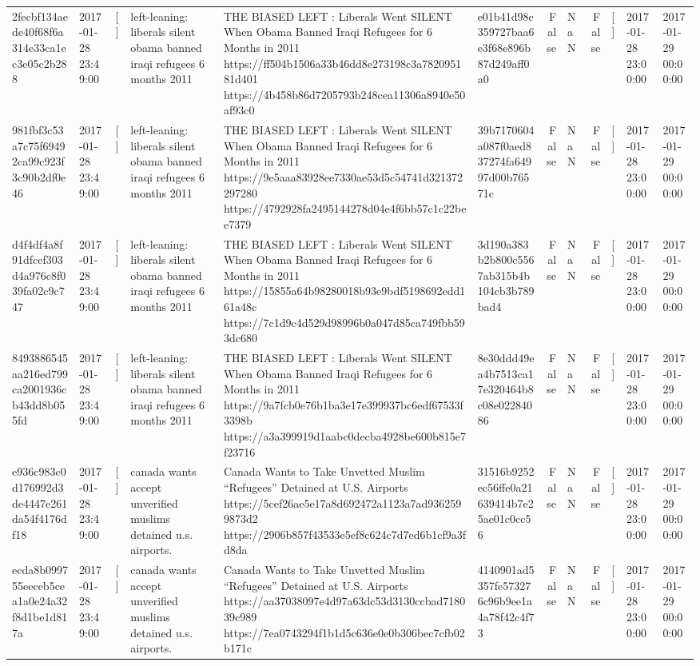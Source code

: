 \begin{tabular}{llllllrlrlll}
2fecbf134aede40f68f6a314e33ca1ec3e05c2b288 & 2017-01-28 23:49:00 & [] & left-leaning: liberals silent obama banned iraqi refugees 6 months 2011 & THE BIASED LEFT : Liberals Went SILENT When Obama Banned Iraqi Refugees for 6 Months in 2011 https://ff504b1506a33b46dd8e273198c3a782095181d401 https://4b458b86d7205793b248cea11306a8940e50af93c0 & e01b41d98c359727baa6e3f68e896b87d249aff0a0 & False & NaN & False & [] & 2017-01-28 23:00:00 & 2017-01-29 00:00:00 \\
981fbf3c53a7c75f69492ca99c923f3c90b2df0e46 & 2017-01-28 23:49:00 & [] & left-leaning: liberals silent obama banned iraqi refugees 6 months 2011 & THE BIASED LEFT : Liberals Went SILENT When Obama Banned Iraqi Refugees for 6 Months in 2011 https://9e5aaa83928ee7330ae53d5c54741d321372297280 https://4792928fa2495144278d04e4f6bb57c1c22bee7379 & 39b7170604a087f0aed837274fa64997d00b76571c & False & NaN & False & [] & 2017-01-28 23:00:00 & 2017-01-29 00:00:00 \\
d4f4df4a8f91dfcef303d4a976c8f039fa02c9c747 & 2017-01-28 23:49:00 & [] & left-leaning: liberals silent obama banned iraqi refugees 6 months 2011 & THE BIASED LEFT : Liberals Went SILENT When Obama Banned Iraqi Refugees for 6 Months in 2011 https://15855a64b98280018b93e9bdf5198692edd161a48c https://7c1d9c4d529d98996b0a047d85ca749fbb593dc680 & 3d190a383b2b800c5567ab315b4b104cb3b789bad4 & False & NaN & False & [] & 2017-01-28 23:00:00 & 2017-01-29 00:00:00 \\
8493886545aa216ed799ca2001936cb43dd8b055fd & 2017-01-28 23:49:00 & [] & left-leaning: liberals silent obama banned iraqi refugees 6 months 2011 & THE BIASED LEFT : Liberals Went SILENT When Obama Banned Iraqi Refugees for 6 Months in 2011 https://9a7fcb0e76b1ba3e17e399937bc6edf67533f3398b https://a3a399919d1aabc0decba4928be600b815e7f23716 & 8e30ddd49ea4b7513ca17e320464b8c08e02284086 & False & NaN & False & [] & 2017-01-28 23:00:00 & 2017-01-29 00:00:00 \\
e936c983c0d176992d3de4447e261da54f4176df18 & 2017-01-28 23:49:00 & [] & canada wants accept unverified muslims detained u.s. airports. & Canada Wants to Take Unvetted Muslim “Refugees” Detained at U.S. Airports https://5cef26ae5e17a8d692472a1123a7ad9362599873d2 https://2906b857f43533e5ef8c624c7d7ed6b1cf9a3fd8da & 31516b9252ec56ffe0a21639414b7e25ae01c0cc56 & False & NaN & False & [] & 2017-01-28 23:00:00 & 2017-01-29 00:00:00 \\
ecda8b099755eeceb5cea1a0e24a32f8d1be1d817a & 2017-01-28 23:49:00 & [] & canada wants accept unverified muslims detained u.s. airports. & Canada Wants to Take Unvetted Muslim “Refugees” Detained at U.S. Airports https://aa37038097e4d97a63dc53d3130ccbad718039c989 https://7ea0743294f1b1d5c636e0e0b306bec7cfb02b171c & 4140901ad5357fe573276c96b9ee1a4a78f42c4f73 & False & NaN & False & [] & 2017-01-28 23:00:00 & 2017-01-29 00:00:00 \\

\end{tabular}
